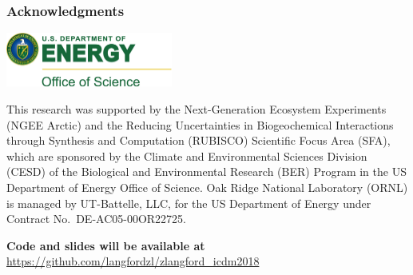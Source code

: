 \begin{frame}
 \frametitle{Acknowledgments}\footnotesize
 \begin{center}
  \vskip-0.25in
  \includegraphics[height=0.70in]{logos/DOE_Office_of_Science_logo.pdf}
 \end{center}
This research was supported by
the Next-Generation Ecosystem Experiments (NGEE Arctic)
and
the Reducing Uncertainties in Biogeochemical Interactions through Synthesis and Computation (RUBISCO) Scientific Focus Area (SFA),
which are sponsored by the Climate and Environmental Sciences Division (CESD)
of the Biological and Environmental Research (BER) Program
in the US Department of Energy Office of Science.
Oak Ridge National Laboratory (ORNL) is managed by UT-Battelle, LLC,
for the US Department of Energy under Contract No.\ DE-AC05-00OR22725.

\medskip
\textbf{Code and slides will be available at}
\url{https://github.com/langfordzl/zlangford_icdm2018}

\end{frame}

